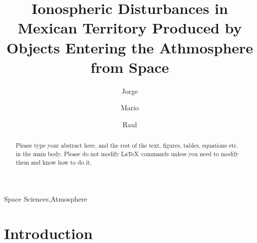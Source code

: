 \documentclass[times,twocolumn,final,authoryear]{elsarticle}
\begin{document}

\begin{frontmatter}

\title{Ionospheric Disturbances in Mexican Territory Produced by Objects Entering the Athmosphere from Space }%

\author[1]{Jorge }

\author[1]{Mario }
\author[1]{Raul }

\address[1]{Escuela Nacional de Estudios Superiores, UNAM, campus Morelia, Antigua Carretera a P\'atzcuaro No. 8701
Col. Ex Hacienda de San Jos\'e de la Huerta, Morelia, Michoac\'an, 58190, M\'exico}



\begin{abstract}
Please type your abstract here, and the rest of the text, figures,
tables, equations etc. in the main body. Please do not modify LaTeX\ 
commands unless you need to modify them and know how to do it.
\end{abstract}

\begin{keyword}
\KWD Space Sciences\sep Atmosphere%
\end{keyword}

\end{frontmatter}


\section{Introduction}
\label{sec1}

\end{document}
